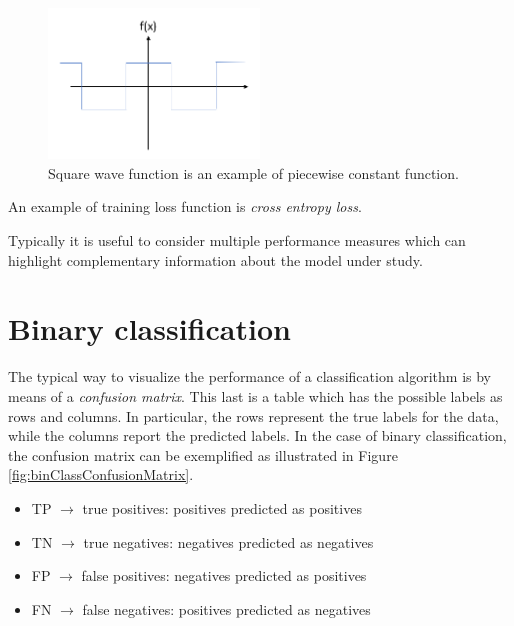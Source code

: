 \begin{figure}[H]
	\centering
	\includegraphics[width=0.5\textwidth]{
		images/06_Evaluation_squareWaveFunction.png
	}
	\caption{Square wave function is an example of piecewise constant function.}
	\label{fig:square_wave}
\end{figure}

An example of training loss function is \textit{cross entropy loss}.
\newline

Typically it is useful to consider multiple performance measures which can highlight
complementary information about the model under study.

\section{Binary classification}
\label{sec::performanceBinaryClassification} The typical way to visualize the performance
of a classification algorithm is by means of a \textit{confusion matrix}. This last
is a table which has the possible labels as rows and columns. In particular, the
rows represent the true labels for the data, while the columns report the
predicted labels. In the case of binary classification, the confusion matrix can
be exemplified as illustrated in Figure \ref{fig:binClassConfusionMatrix}.

\begin{itemize}
	\item TP $\rightarrow$ true positives: positives predicted as positives

	\item TN $\rightarrow$ true negatives: negatives predicted as negatives

	\item FP $\rightarrow$ false positives: negatives predicted as positives

	\item FN $\rightarrow$ false negatives: positives predicted as negatives
\end{itemize}

